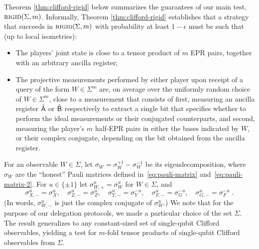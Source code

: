Theorem \ref{thm:clifford-rigid} below summarizes the guarantees of our main
test,  $\textsc{rigid}(\Sigma,m)$. Informally, Theorem \ref{thm:clifford-rigid} establishes that a strategy that succeeds in $\textsc{rigid}(\Sigma,m)$ with probability at least  $1-\epsilon$ must be such that (up to local isometries):
\begin{itemize}
    \item The players' joint state is close to a tensor product of $m$ EPR pairs, together with an arbitrary ancilla register;
    \item The projective measurements performed by either player upon receipt of a query of the form $W\in\Sigma^m$ are, on average over the uniformly random choice of $W\in\Sigma^m$, close to a measurement that consists of first, measuring an ancilla register $\hat{{\textsf{A}}}$ or $\hat{{\textsf{B}}}$ respectively to extract a single bit that specifies whether to perform the ideal measurements or their conjugated counterparts, and second, measuring the player's $m$ half-EPR pairs in either the bases indicated by $W$, or their complex conjugate, depending on the bit obtained from the ancilla register. 
\end{itemize}

For an observable $W\in\Sigma$, let $\sigma_W = \sigma_W^{+1} - \sigma_W^{-1}$ be its eigendecomposition, where $\sigma_W$ are the ``honest'' Pauli matrices defined in~\eqref{eq:pauli-matrix} and~\eqref{eq:pauli-matrix-2}. For $u\in\{\pm 1\}$ let $\sigma_{W,+}^u = \sigma_W^u$ for $W\in \Sigma$, and 
$$ \sigma_{X,-}^u = \sigma_X^u,\quad\sigma_{Z,-}^u = \sigma_Z^u,\quad\sigma_{Y,-}^u = \sigma_Y^{-u},\quad\sigma_{F,-}^u = \sigma_G^{-u},\quad\sigma_{G,-}^u = \sigma_F^{-u}\;.$$
(In words, $\sigma_{W,-}^u$ is just the complex conjugate of $\sigma_W^u$.) We note that for the purpose of our delegation protocols, we made a particular choice of the set $\Sigma$. The result generalizes to any constant-sized set of single-qubit Clifford observables,  yielding a test for $m$-fold tensor products of single-qubit Clifford observables from $\Sigma$.

